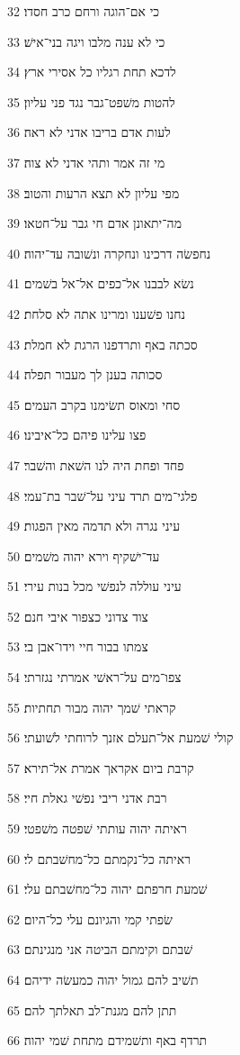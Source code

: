 \par 32 כי אם־הוגה ורחם כרב חסדו׃
\par 33 כי לא ענה מלבו ויגה בני־אישׁ׃
\par 34 לדכא תחת רגליו כל אסירי ארץ׃
\par 35 להטות משׁפט־גבר נגד פני עליון׃
\par 36 לעות אדם בריבו אדני לא ראה׃
\par 37 מי זה אמר ותהי אדני לא צוה׃
\par 38 מפי עליון לא תצא הרעות והטוב׃
\par 39 מה־יתאונן אדם חי גבר על־חטאו׃
\par 40 נחפשׂה דרכינו ונחקרה ונשׁובה עד־יהוה׃
\par 41 נשׂא לבבנו אל־כפים אל־אל בשׁמים׃
\par 42 נחנו פשׁענו ומרינו אתה לא סלחת׃
\par 43 סכתה באף ותרדפנו הרגת לא חמלת׃
\par 44 סכותה בענן לך מעבור תפלה׃
\par 45 סחי ומאוס תשׂימנו בקרב העמים׃
\par 46 פצו עלינו פיהם כל־איבינו׃
\par 47 פחד ופחת היה לנו השׁאת והשׁבר׃
\par 48 פלגי־מים תרד עיני על־שׁבר בת־עמי׃
\par 49 עיני נגרה ולא תדמה מאין הפגות׃
\par 50 עד־ישׁקיף וירא יהוה משׁמים׃
\par 51 עיני עוללה לנפשׁי מכל בנות עירי׃
\par 52 צוד צדוני כצפור איבי חנם׃
\par 53 צמתו בבור חיי וידו־אבן בי׃
\par 54 צפו־מים על־ראשׁי אמרתי נגזרתי׃
\par 55 קראתי שׁמך יהוה מבור תחתיות׃
\par 56 קולי שׁמעת אל־תעלם אזנך לרוחתי לשׁועתי׃
\par 57 קרבת ביום אקראך אמרת אל־תירא׃
\par 58 רבת אדני ריבי נפשׁי גאלת חיי׃
\par 59 ראיתה יהוה עותתי שׁפטה משׁפטי׃
\par 60 ראיתה כל־נקמתם כל־מחשׁבתם לי׃
\par 61 שׁמעת חרפתם יהוה כל־מחשׁבתם עלי׃
\par 62 שׂפתי קמי והגיונם עלי כל־היום׃
\par 63 שׁבתם וקימתם הביטה אני מנגינתם׃
\par 64 תשׁיב להם גמול יהוה כמעשׂה ידיהם׃
\par 65 תתן להם מגנת־לב תאלתך להם׃
\par 66 תרדף באף ותשׁמידם מתחת שׁמי יהוה׃

